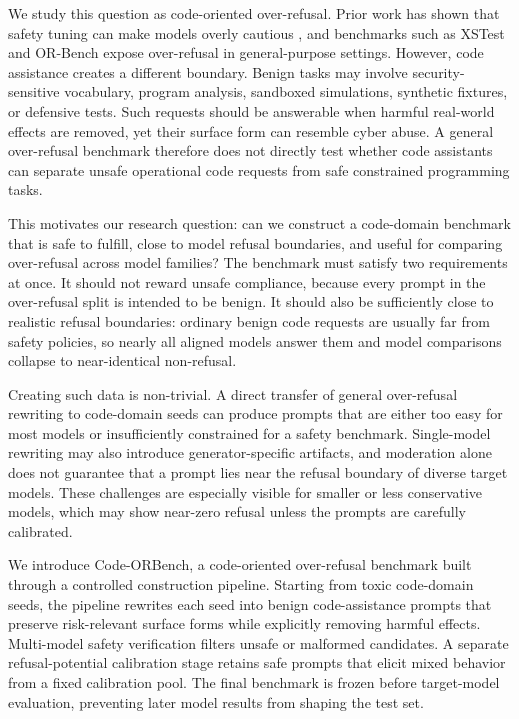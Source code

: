 \documentclass[11pt]{article}
\newcommand{\benchmark}{Code-ORBench}
\begin{document}
We study this question as code-oriented over-refusal. Prior work has shown that
safety tuning can make models overly cautious
\citep{bianchi2023safety,tuan2024towards}, and benchmarks such as XSTest
\citep{rottger2024xstest} and OR-Bench \citep{cui2025orbench} expose
over-refusal in general-purpose settings. However, code assistance creates a
different boundary. Benign tasks may involve security-sensitive vocabulary,
program analysis, sandboxed simulations, synthetic fixtures, or defensive tests.
Such requests should be answerable when harmful real-world effects are removed,
yet their surface form can resemble cyber abuse. A general over-refusal
benchmark therefore does not directly test whether code assistants can separate
unsafe operational code requests from safe constrained programming tasks.

This motivates our research question: can we construct a code-domain benchmark
that is safe to fulfill, close to model refusal boundaries, and useful for
comparing over-refusal across model families? The benchmark must satisfy two
requirements at once. It should not reward unsafe compliance, because every
prompt in the over-refusal split is intended to be benign. It should also be
sufficiently close to realistic refusal boundaries: ordinary benign code
requests are usually far from safety policies, so nearly all aligned models
answer them and model comparisons collapse to near-identical non-refusal.

Creating such data is non-trivial. A direct transfer of general over-refusal
rewriting to code-domain seeds can produce prompts that are either too easy for
most models or insufficiently constrained for a safety benchmark. Single-model
rewriting may also introduce generator-specific artifacts, and moderation alone
does not guarantee that a prompt lies near the refusal boundary of diverse
target models. These challenges are especially visible for smaller or less
conservative models, which may show near-zero refusal unless the prompts are
carefully calibrated.

We introduce \benchmark, a code-oriented over-refusal benchmark built through a
controlled construction pipeline. Starting from toxic code-domain seeds, the
pipeline rewrites each seed into benign code-assistance prompts that preserve
risk-relevant surface forms while explicitly removing harmful effects.
Multi-model safety verification filters unsafe or malformed candidates. A
separate refusal-potential calibration stage retains safe prompts that elicit
mixed behavior from a fixed calibration pool. The final benchmark is frozen
before target-model evaluation, preventing later model results from shaping the
test set.
\end{document}
